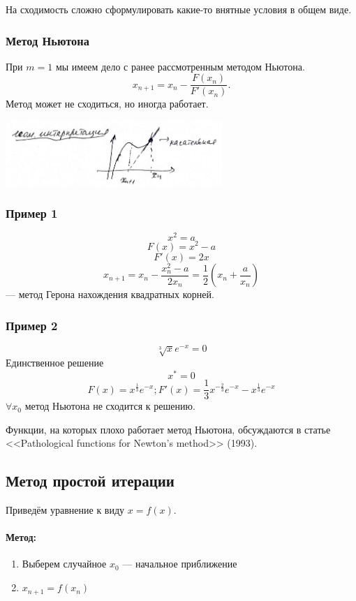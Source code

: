 На сходимость сложно сформулировать какие-то внятные условия в общем виде.

\subsubsection{Метод Ньютона}
При $m=1$ мы имеем дело с ранее рассмотренным методом Ньютона. 
\[
	x_{n+1} = x_n - \frac{F(x_n)}{F'(x_n)}.
\]
Метод может не сходиться, но иногда работает.
\begin{center}
	\includegraphics[width=8.2cm]{../figures/lection_1/figure_2.png}
\end{center}

\subsubsection{Пример 1}
\[x^2=a\]
\[F(x) = x^2 - a\]
\[F'(x) = 2x\]
\[x_{n+1} = x_n - \frac{x^2_n - a}{2x_n} = \frac{1}{2}(x_n+\frac{a}{x_n})\] --- метод Герона нахождения квадратных корней.

\subsubsection{Пример 2}
\[\sqrt[3]{x}e^{-x} = 0\]
Единственное решение \[x^* = 0\] 
\[F(x) = x^{\frac{1}{3}} e^{-x}; F'(x) = \frac{1}{3}x^{-\frac{2}{3}}e^{-x} - x^{\frac{1}{3}}e^{-x}\] 
$\forall x_0$ метод Ньютона не сходится к решению.

Функции, на которых плохо работает метод Ньютона, обсуждаются в статье <<Pathological functions for Newton's method>> (1993).

\subsection{Метод простой итерации}
Приведём уравнение к виду $x = f(x)$.
\paragraph{Метод:} \begin{enumerate}
\item Выберем случайное $x_0$ --- начальное приближение
\item $x_{n+1} = f(x_n)$
\end{enumerate}
